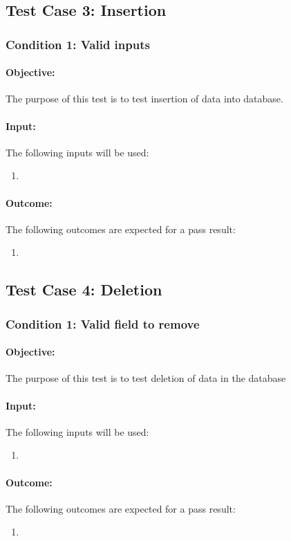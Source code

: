 \documentclass{article}
\begin{document}
\subsection{Test Case 3: Insertion}\label{test3}
\subsubsection{Condition 1: Valid inputs }
\paragraph{Objective:} The purpose of this test is to test insertion of data into database.
\paragraph{Input:} The following inputs will be used:
\begin{enumerate}
	\item 
\end{enumerate}
\paragraph{Outcome:} The following outcomes are expected for a pass result:
\begin{enumerate}
	\item 
\end{enumerate}

\subsection{Test Case 4: Deletion}\label{test4}
\subsubsection{Condition 1: Valid field to remove }
\paragraph{Objective:} The purpose of this test is to test deletion of data in the database
\paragraph{Input:} The following inputs will be used:
\begin{enumerate}
	\item 
\end{enumerate}
\paragraph{Outcome:} The following outcomes are expected for a pass result:
\begin{enumerate}
	\item 
\end{enumerate}
\end{document}
